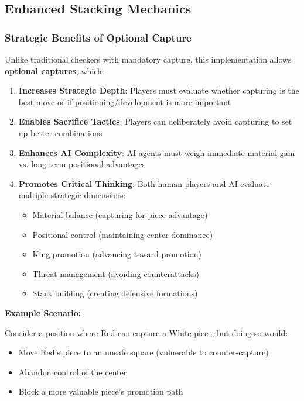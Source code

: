 \documentclass[12pt,a4paper]{article}
\begin{document}
\subsection{Enhanced Stacking Mechanics}

\subsubsection{Strategic Benefits of Optional Capture}

Unlike traditional checkers with mandatory capture, this implementation allows \textbf{optional captures}, which:

\begin{enumerate}
    \item \textbf{Increases Strategic Depth}: Players must evaluate whether capturing is the best move or if positioning/development is more important
    \item \textbf{Enables Sacrifice Tactics}: Players can deliberately avoid capturing to set up better combinations
    \item \textbf{Enhances AI Complexity}: AI agents must weigh immediate material gain vs. long-term positional advantages
    \item \textbf{Promotes Critical Thinking}: Both human players and AI evaluate multiple strategic dimensions:
    \begin{itemize}
        \item Material balance (capturing for piece advantage)
        \item Positional control (maintaining center dominance)
        \item King promotion (advancing toward promotion)
        \item Threat management (avoiding counterattacks)
        \item Stack building (creating defensive formations)
    \end{itemize}
\end{enumerate}

\textbf{Example Scenario:}

Consider a position where Red can capture a White piece, but doing so would:
\begin{itemize}
    \item Move Red's piece to an unsafe square (vulnerable to counter-capture)
    \item Abandon control of the center
    \item Block a more valuable piece's promotion path
\end{itemize}
\end{document}

